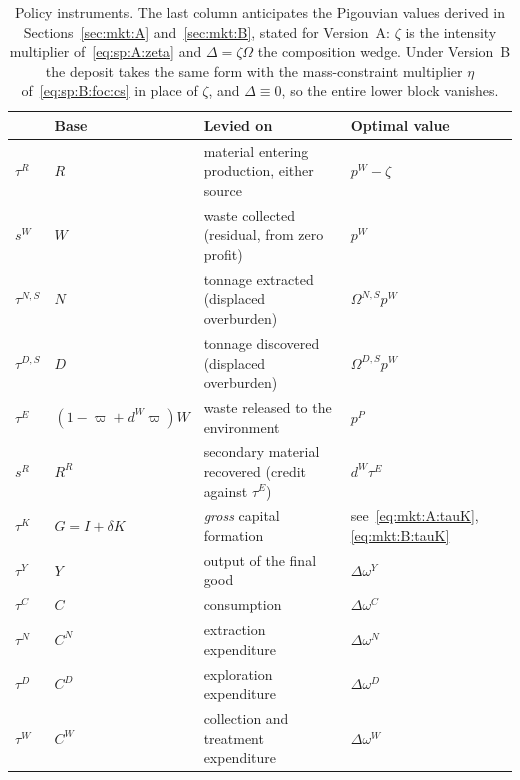 \begin{table}[H]
\centering
\caption{Policy instruments. The last column anticipates the Pigouvian values derived in
Sections~\ref{sec:mkt:A} and~\ref{sec:mkt:B}, stated for Version~A: $\zeta$ is the intensity
multiplier of~\eqref{eq:sp:A:zeta} and $\Delta=\zeta\Omega$ the composition wedge. Under Version~B the
deposit takes the same form with the mass-constraint multiplier $\eta$ of~\eqref{eq:sp:B:foc:cs} in
place of $\zeta$, and $\Delta\equiv0$, so the entire lower block vanishes.}
\label{tab:mkt:instruments}
\setlength{\tabcolsep}{4pt}
\renewcommand{\arraystretch}{1.05}
\begin{tabular}{@{}p{}p{}p{}p{}@{}}
\toprule
& Base & Levied on & Optimal value \\
\midrule
$\tau^R$      & $R$                  & material entering production, either source & $p^W-\zeta$ \\
$s^W$         & $W$                  & waste collected (residual, from zero profit) & $p^W$ \\
$\tau^{N,S}$  & $N$                  & tonnage extracted (displaced overburden) & $\Omega^{N,S}p^W$ \\
$\tau^{D,S}$  & $D$                  & tonnage discovered (displaced overburden) & $\Omega^{D,S}p^W$ \\
$\tau^E$      & $\left(1-\varpi+d^W\varpi\right)W$ & waste released to the environment & $p^P$ \\
$s^R$         & $R^R$                & secondary material recovered (credit against $\tau^E$) & $d^W\tau^E$ \\
$\tau^K$      & $G=I+\delta K$       & \emph{gross} capital formation & see~\eqref{eq:mkt:A:tauK}, \eqref{eq:mkt:B:tauK} \\
\midrule
$\tau^Y$      & $Y$                  & output of the final good & $\Delta\omega^Y$ \\
$\tau^C$      & $C$                  & consumption & $\Delta\omega^C$ \\
$\tau^N$      & $C^N$                & extraction expenditure & $\Delta\omega^N$ \\
$\tau^D$      & $C^D$                & exploration expenditure & $\Delta\omega^D$ \\
$\tau^W$      & $C^W$                & collection and treatment expenditure & $\Delta\omega^W$ \\
\bottomrule
\end{tabular}
\end{table}

